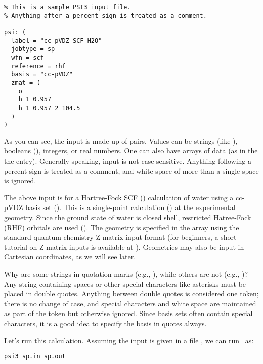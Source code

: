 \begin{verbatim}
% This is a sample PSI3 input file.
% Anything after a percent sign is treated as a comment.

psi: (
  label = "cc-pVDZ SCF H2O"
  jobtype = sp
  wfn = scf
  reference = rhf
  basis = "cc-pVDZ"
  zmat = (
    o
    h 1 0.957
    h 1 0.957 2 104.5
  )
)
\end{verbatim}

As you can see, the input is made up of  pairs.  
Values can be strings (like ), booleans 
(), integers, or real numbers.  One can 
also have arrays of data (as in the the  entry).  Generally
speaking, input is not case-sensitive.  Anything following a percent sign
is treated as a comment, and white space of more than a single space is
ignored.  

The above input is for a Hartree-Fock SCF ()
calculation of water using a cc-pVDZ basis set 
().  This is a 
single-point calculation () at the experimental 
geometry.  Since the ground state of water is closed shell, restricted 
Hatree-Fock (RHF) orbitals are used ().  
The geometry is specified in the  array using the
standard quantum chemistry Z-matrix input format (for beginners, a short
tutorial on Z-matrix inputs is available at
).  Geometries
may also be input in Cartesian coordinates, as we will see later.

Why are some strings in quotation marks (e.g., ), while others are not (e.g., )?  Any
string containing spaces or other special characters like asterisks
must be placed in double quotes.  Anything between double quotes is 
considered one token; there is no change of case, and special characters 
and white space are maintained as part of the token but otherwise ignored.
Since basis sets often contain special characters, it is a good idea to 
specify the basis in quotes always.

Let's run this calculation.  Assuming the input is given in a file
, we can run \PSIthree\ as:
\begin{verbatim}
psi3 sp.in sp.out
\end{verbatim}

